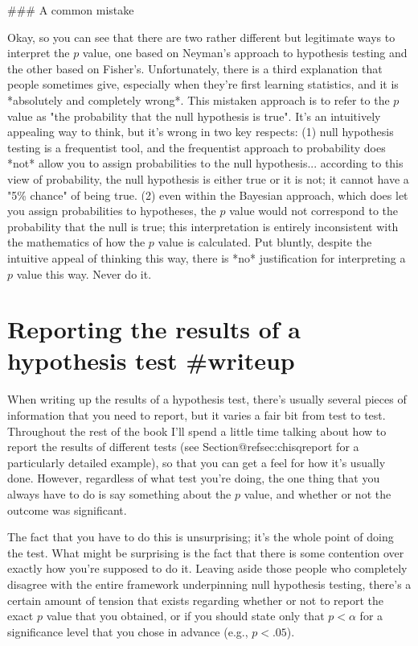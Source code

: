 ### A common mistake

Okay, so you can see that there are two rather different but legitimate ways to interpret the $p$ value, one based on Neyman's approach to hypothesis testing and the other based on Fisher's. Unfortunately, there is a third explanation that people sometimes give, especially when they're first learning statistics, and it is *absolutely and completely wrong*. This mistaken approach is to refer to the $p$ value as "the probability that the null hypothesis is true". It's an intuitively appealing way to think, but it's wrong in two key respects: (1) null hypothesis testing is a frequentist tool, and the frequentist approach to probability does *not* allow you to assign probabilities to the null hypothesis... according to this view of probability, the null hypothesis is either true or it is not; it cannot have a "5\% chance" of being true. (2) even within the Bayesian approach, which does let you assign probabilities to hypotheses, the $p$ value would not correspond to the probability that the null is true; this interpretation is entirely inconsistent with the mathematics of how the $p$ value is calculated. Put bluntly, despite the intuitive appeal of thinking this way, there is *no* justification for interpreting a $p$ value this way. Never do it.


\section{Reporting the results of a hypothesis test {#writeup}}

When writing up the results of a hypothesis test, there's usually several pieces of information that you need to report, but it varies a fair bit from test to test. Throughout the rest of the book I'll spend a little time talking about how to report the results of different tests (see Section@refsec:chisqreport for a particularly detailed example), so that you can get a feel for how it's usually done. However, regardless of what test you're doing, the one thing that you always have to do is say something about the $p$ value, and whether or not the outcome was significant. 

The fact that you have to do this is unsurprising; it's the whole point of doing the test. What might be surprising is the fact that there is some contention over exactly how you're supposed to do it. Leaving aside those people who completely disagree with the entire framework underpinning null hypothesis testing, there's a certain amount of tension that exists regarding whether or not to report the exact $p$ value that you obtained, or if you should state only that $p < \alpha$ for a significance level that you chose in advance (e.g., $p<.05$). 

